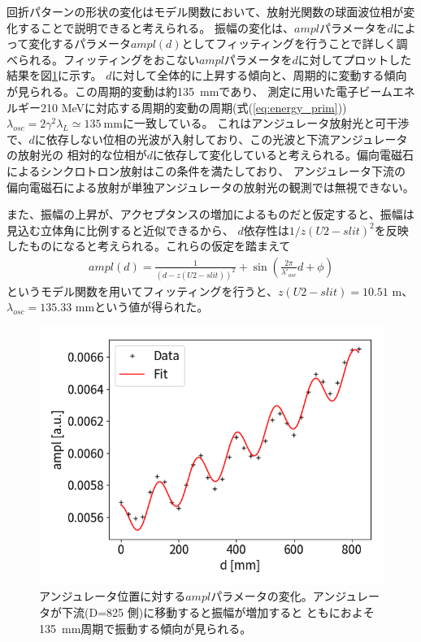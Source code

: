 \documentclass[a4paper,11pt,uplatex]{jsbook}
\begin{document}
回折パターンの形状の変化はモデル関数において、放射光関数の球面波位相が変化することで説明できると考えられる。
振幅の変化は、$ampl$パラメータを$d$によって変化するパラメータ$ampl(d)$としてフィッティングを行うことで詳しく調べられる。フィッティングをおこない$ampl$パラメータを$d$に対してプロットした結果を図\ref{DCampl}に示す。
$d$に対して全体的に上昇する傾向と、周期的に変動する傾向が見られる。この周期的変動は約135~mmであり、
測定に用いた電子ビームエネルギー210 MeVに対応する周期的変動の周期(式(\ref{eq:energy_prim}))$\lambda_{osc} = 2\gamma^2\lambda_L \simeq 135~\text{mm}$に一致している。
これはアンジュレータ放射光と可干渉で、$d$に依存しない位相の光波が入射しており、この光波と下流アンジュレータの放射光の
相対的な位相が$d$に依存して変化していると考えられる。偏向電磁石によるシンクロトロン放射はこの条件を満たしており、
アンジュレータ下流の偏向電磁石による放射が単独アンジュレータの放射光の観測では無視できない。

また、振幅の上昇が、アクセプタンスの増加によるものだと仮定すると、振幅は見込む立体角に比例すると近似できるから、
$d$依存性は$1/z(U2-slit)^2$を反映したものになると考えられる。これらの仮定を踏まえて
\begin{eqnarray}
  ampl(d) = \frac{1}{(d - z(U2-slit))^2} + \sin\left( \frac{2\pi}{\lambda'_{osc}}d + \phi \right)\label{eq:ampl}
\end{eqnarray}
というモデル関数を用いてフィッティングを行うと、$z(U2-slit) = 10.51$ m、$\lambda_{osc}= 135.33$ mmという値が得られた。

\begin{figure}[h]
  \centering
  \includegraphics[width=0.8\linewidth]{image/4-DCampl.png}
  \caption[アンジュレータ位置依存性]{アンジュレータ位置に対する$ampl$パラメータの変化。アンジュレータが下流(D=825 側)に移動すると振幅が増加すると
  ともにおよそ135~mm周期で振動する傾向が見られる。}\label{DCampl}
\end{figure}
\end{document}
